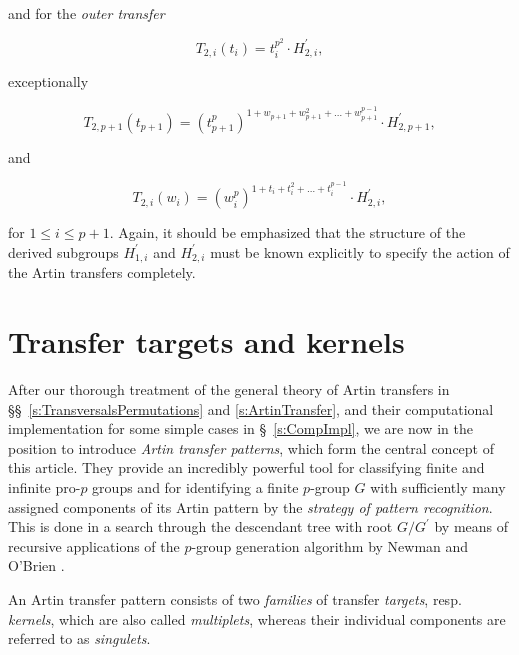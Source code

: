 \documentclass{amsart}
\theoremstyle{definition}
\numberwithin{equation}{section}
\begin{document}
\noindent
and for the \textit{outer transfer}

\begin{equation}
\label{eqn:OuterATLyr2P2xP}
T_{2,i}(t_i)=t_i^{p^2}\cdot H_{2,i}^\prime,
\end{equation}

\noindent
exceptionally

\begin{equation}
\label{eqn:OuterATLyr2Var1P2xP}
T_{2,p+1}(t_{p+1})=(t_{p+1}^p)^{1+w_{p+1}+w_{p+1}^2+\ldots +w_{p+1}^{p-1}}\cdot H_{2,p+1}^\prime,
\end{equation}

\noindent
and

\begin{equation}
\label{eqn:OuterATLyr2Var2P2xP}
T_{2,i}(w_i)=(w_i^p)^{1+t_i+t_i^2+\ldots +t_i^{p-1}}\cdot H_{2,i}^\prime,
\end{equation}

\noindent
for \(1\le i\le p+1\).
Again, it should be emphasized that
the structure of the derived subgroups \(H_{1,i}^\prime\) and \(H_{2,i}^\prime\)
must be known explicitly
to specify the action of the Artin transfers completely.



\section{Transfer targets and kernels}
\label{s:TransferTargetKernel}

After our thorough treatment of the general theory of Artin transfers in \S\S\
\ref{s:TransversalsPermutations}
and
\ref{s:ArtinTransfer},
and their computational implementation for some simple cases in \S\
\ref{s:CompImpl},
we are now in the position to introduce \textit{Artin transfer patterns},
which form the central concept of this article.
They provide an incredibly powerful tool for
classifying finite and infinite pro-\(p\) groups
and for identifying a finite \(p\)-group \(G\)
with sufficiently many assigned components of its Artin pattern
by the \textit{strategy of pattern recognition}.
This is done in a search through the descendant tree with root \(G/G^\prime\)
by means of recursive applications of the \(p\)-group generation algorithm
by Newman
\cite{Nm}
and O'Brien
\cite{Ob}.

An Artin transfer pattern consists of two \textit{families}
of transfer \textit{targets}, resp. \textit{kernels},
which are also called \textit{multiplets},
whereas their individual components are referred to as \textit{singulets}.
\end{document}
